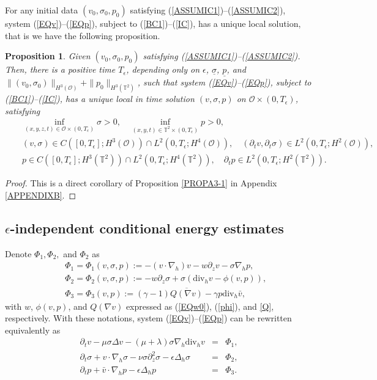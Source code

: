\documentclass[12pt,reqno]{amsart}
\numberwithin{equation}{section}
\newtheorem{proposition}[theorem]{Proposition}
\begin{document}
For any initial data $(v_{0}, \sigma_{0}, p_{0})$ satisfying (\ref{ASSUMIC1})--(\ref{ASSUMIC2}), system (\ref{EQv})--(\ref{EQp}),
subject to (\ref{BC1})--(\ref{IC}), has a unique local solution, that is we have the following proposition.

\begin{proposition}
  \label{PROPLOC-e}
  Given $(v_{0}, \sigma_{0}, p_{0})$ satisfying (\ref{ASSUMIC1})--(\ref{ASSUMIC2}).
  Then, there is a positive time $T_\epsilon$,
  depending only on $\epsilon$, $\underline\sigma$, $\underline p$, and
  $\|(v_{0},\sigma_{0})\|_{H^3(\mathcal O)}+\|p_{0}\|_{H^3(\mathbb T^2)}$, such that system (\ref{EQv})--(\ref{EQp}),
  subject to (\ref{BC1})--(\ref{IC}), has a unique local in time solution $(v,\sigma,p)$ on $\mathcal O\times(0,T_\epsilon)$,
  satisfying
  \begin{eqnarray*}
  &&\inf_{(x,y,z,t)\in\mathcal O\times(0,T_\epsilon)}\sigma>0,\quad \inf_{(x,y,t)\in\mathbb T^2\times(0,T_\epsilon)}p>0,\\
    &&(v,\sigma)\in C([0,T_\epsilon]; H^3(\mathcal O))\cap L^2(0,T_\epsilon; H^4(\mathcal O)),\quad(\partial_tv,\partial_t\sigma)\in L^2(0,T_\epsilon; H^2(\mathcal O)),\\
    &&p\in C([0,T_\epsilon]; H^3(\mathbb T^2))\cap L^2(0,T_\epsilon; H^4(\mathbb T^2)),\quad\partial_tp\in  L^2(0,T_\epsilon; H^2(\mathbb T^2)).
  \end{eqnarray*}
\end{proposition}

\begin{proof}
This is a direct corollary of Proposition \ref{PROPA3-1} in Appendix \ref{APPENDIXB}.
\end{proof}

\subsection{$\epsilon$-independent conditional energy estimates}

Denote $\Phi_1, \Phi_2,$ and $\Phi_2$ as
\begin{eqnarray}
  &&\Phi_1=\Phi_1(v,\sigma,p):=-(v\cdot\nabla_h)v-w\partial_zv-\sigma\nabla_hp,\label{Phi1}\\
  &&\Phi_2=\Phi_2(v,\sigma,p):=-w\partial_z\sigma+\sigma(\text{div}_hv-\phi(v,p)),\label{Phi2}\\
  &&\Phi_3=\Phi_3(v,p):=(\gamma-1)\overline{Q(\nabla v)}-\gamma p\text{div}_h\bar v, \label{Phi3}
\end{eqnarray}
with $w$, $\phi(v,p)$, and $Q(\nabla v)$ expressed as (\ref{EQw0}), (\ref{phi}), and \eqref{Q}, respectively. With these notations, system (\ref{EQv})--(\ref{EQp}) can be
rewritten equivalently as
\begin{eqnarray}
  \partial_tv-\mu\sigma\Delta v-(\mu+\lambda)\sigma\nabla_h\text{div}_hv&=&\Phi_1,\label{EQv'}\\
  \partial_t\sigma+v\cdot\nabla_h\sigma-\nu\sigma\partial_z^2\sigma-\epsilon\Delta_h\sigma&=&\Phi_2,
  \label{EQs'}\\
  \partial_tp+\bar v\cdot\nabla_hp-\epsilon\Delta_hp&=&\Phi_3. \label{EQp'}
\end{eqnarray}
\end{document}
